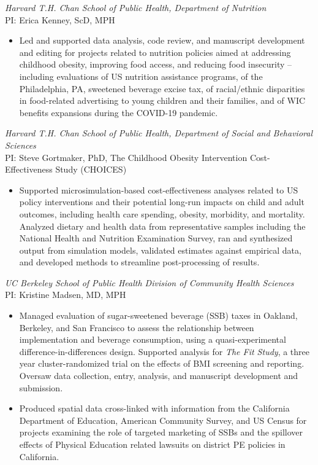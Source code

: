 \documentclass{cv_style}
\begin{document}
\textit{Harvard T.H. Chan School of Public Health, Department of Nutrition} \\
PI: Erica Kenney, ScD, MPH
\begin{itemize}
    \item Led and supported data analysis, code review, and manuscript development and editing for projects related to nutrition policies aimed at addressing childhood obesity, improving food access, and reducing food insecurity -- including evaluations of US nutrition assistance programs, of the Philadelphia, PA, sweetened beverage excise tax, of racial/ethnic disparities in food-related advertising to young children and their families, and of WIC benefits expansions during the COVID-19 pandemic.
\end{itemize}

\textit{Harvard T.H. Chan School of Public Health, Department of Social and Behavioral Sciences} \\
PI: Steve Gortmaker, PhD, The Childhood Obesity Intervention Cost-Effectiveness Study (CHOICES)
\begin{itemize}
    \item Supported microsimulation-based cost-effectiveness analyses related to US policy interventions and their potential long-run impacts on child and adult outcomes, including health care spending, obesity, morbidity, and mortality. Analyzed dietary and health data from representative samples including the National Health and Nutrition Examination Survey, ran and synthesized output from simulation models, validated estimates against empirical data, and developed methods to streamline post-processing of results.
\end{itemize}

\textit{UC Berkeley School of Public Health Division of Community Health Sciences} \\
PI: Kristine Madsen, MD, MPH
\begin{itemize}
    \item Managed evaluation of sugar-sweetened beverage (SSB) taxes in Oakland, Berkeley, and San Francisco to assess the relationship between implementation and beverage consumption, using a quasi-experimental difference-in-differences design. Supported analysis for \textit{The Fit Study}, a three year cluster-randomized trial on the effects of BMI screening and reporting. Oversaw data collection, entry, analysis, and manuscript development and submission.
    \item \parskip 1pt Produced spatial data cross-linked with information from the California Department of Education, American Community Survey, and US Census for projects examining the role of targeted marketing of SSBs and the spillover effects of Physical Education related lawsuits on district PE policies in California.
\end{itemize}
\end{document}
